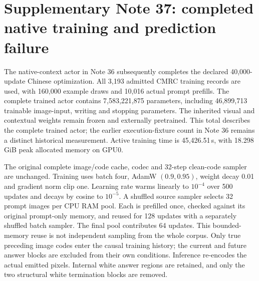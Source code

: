 \documentclass[10pt,a4paper]{article}
\begin{document}

\clearpage
\section*{Supplementary Note 37: completed native training and prediction failure}
The native-context actor in Note 36 subsequently completes the declared
40,000-update Chinese optimization. All 3,193 admitted CMRC training records
are used, with 160,000 example draws and 10,016 actual prompt prefills. The
complete trained actor contains 7,583,221,875 parameters, including 46,899,713
trainable image-input, writing and stopping parameters. The inherited visual
and contextual weights remain frozen and externally pretrained. This total
describes the complete trained actor; the earlier execution-fixture count
in Note 36 remains a distinct historical measurement. Active training time
is 45,426.51\,s, with 18.298\,GiB peak allocated memory on GPU0.

The original complete image/code cache, codec and 32-step clean-code sampler
are unchanged. Training uses batch four, AdamW $(0.9,0.95)$, weight decay
0.01 and gradient norm clip one. Learning rate warms linearly to $10^{-4}$
over 500 updates and decays by cosine to $10^{-5}$. A shuffled source sampler
selects 32 prompt images per CPU RAM pool. Each is prefilled once, checked
against its original prompt-only memory, and reused for 128 updates with a
separately shuffled batch sampler. The final pool contributes 64 updates.
This bounded-memory reuse is not independent sampling from the whole corpus.
Only true preceding image codes enter the causal training history; the
current and future answer blocks are excluded from their own conditions.
Inference re-encodes the actual emitted pixels. Internal white answer regions
are retained, and only the two structural white termination blocks are removed.
\end{document}
